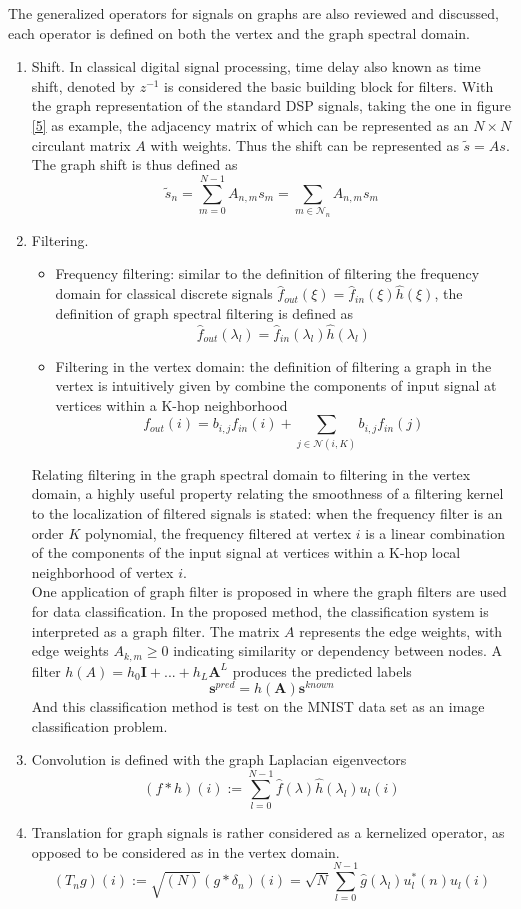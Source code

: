 \documentclass[conference]{IEEEtran}
\begin{document}
The generalized operators for signals on graphs are also reviewed and discussed, each operator is defined on both the vertex and the graph spectral domain. 
\begin{enumerate}
\item Shift. In classical digital signal processing, time delay also known as time shift, denoted by $z^{-1}$ is considered the basic building block for filters. With the graph representation of the standard DSP signals, taking the one in figure \ref{5} as example, the adjacency matrix of which can be represented as an $N\times N$ circulant  matrix $A$ with weights. Thus the shift can be represented as $\tilde{s} = As$. The graph shift is thus defined as 
$$\tilde{s}_n = \sum_{m=0}^{N-1}A_{n,m}s_m=\sum_{m\in\mathcal{N}_n}A_{n,m}s_m$$
\item Filtering. 
\begin{itemize}
\item Frequency filtering: similar to the definition of filtering the frequency domain for classical discrete signals $\hat{f}_{out}(\xi)=\hat{f}_{in}(\xi)\hat{h}(\xi)$, the definition of graph spectral filtering is defined as
$$\hat{f}_{out}(\lambda_l)=\hat{f}_{in}(\lambda_l)\hat{h}(\lambda_l)$$

\item Filtering in the vertex domain: the definition of filtering a graph in the vertex is intuitively given by combine the components of input signal at vertices within a K-hop neighborhood
$$f_{out}(i)=b_{i,j}f_{in}(i)+\sum_{j\in\mathcal{N}(i,K)}b_{i,j}f_{in}(j)$$
\end{itemize}
Relating filtering in the graph spectral domain to filtering in the vertex domain, a highly useful property relating the smoothness of a filtering kernel to the localization of filtered signals is stated: when the frequency filter is an order $K$ polynomial, the frequency filtered at vertex $i$ is a linear combination of the components of the input signal at vertices within a K-hop local neighborhood of vertex $i$. \\
One application of graph filter is proposed in \cite{b4} where the graph filters are used for data classification. In the proposed method, the classification system is interpreted as a graph filter. The matrix $A$ represents the edge weights, with  edge weights $A_{k,m}\geq 0$ indicating similarity or dependency between nodes. A filter $h(A) = h_0\mathbf{I}+...+h_L\mathbf{A}^L$ produces the predicted labels
$$\mathbf{s}^{pred}=h(\mathbf{A})\mathbf{s}^{known}$$
And this classification method is test on the MNIST data set as an image classification problem.

\item Convolution is defined with the graph Laplacian eigenvectors
$$(f*h)(i):=\sum_{l=0}^{N-1}\hat{f}(\lambda)\hat{h}(\lambda_l)u_l(i)$$

\item Translation for graph signals is rather considered as a kernelized operator, as opposed to be considered as in the vertex domain. 
$$(T_ng)(i):=\sqrt{(N)}(g*\delta_n)(i)=\sqrt N\sum_{l=0}^{N-1}\hat{g}(\lambda_l)u_l^*(n)u_l(i)$$
\end{enumerate}
\end{document}
